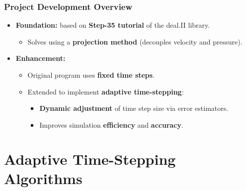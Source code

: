 \documentclass{settings/laserbeam}
\begin{document}
\begin{frame}
    
    \frametitle{Project Development Overview}

    \begin{cbox}
    \begin{itemize}
        \item \textbf{Foundation:} based on \textbf{Step-35 tutorial} of the deal.II library.
        \begin{itemize}
            \item Solves  using a \textbf{projection method} (decouples velocity and pressure).
        \end{itemize}
    \end{itemize}
    \end{cbox}
    \vspace{0.5cm}
    \begin{cbox}
    \begin{itemize}
        \item \textbf{Enhancement:}
        \begin{itemize}
            \item Original program uses \textbf{fixed time steps}.
            \item Extended to implement \textbf{adaptive time-stepping}:
            \begin{itemize}
                \item \textbf{Dynamic adjustment} of time step size via error estimators.
                \item Improves simulation \textbf{efficiency} and \textbf{accuracy}.
            \end{itemize}
        \end{itemize}
    \end{itemize}
    \end{cbox}

\end{frame}

\section{Adaptive Time-Stepping Algorithms}

\begin{frame}
	\begin{cbox}
		{\fontsize{20pt}{7.2}\selectfont {}}
	\end{cbox}
\end{frame}
\end{document}
